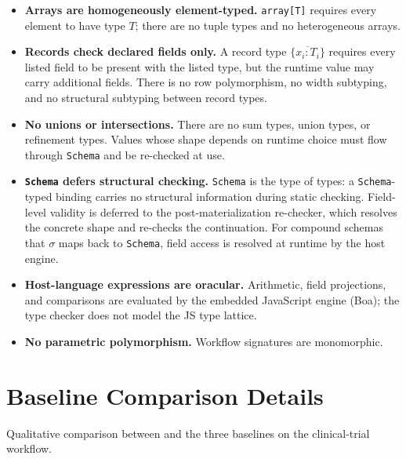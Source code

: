 \begin{itemize} \item \textbf{Arrays are homogeneously element-typed.}
\texttt{array[T]} requires every element to have type $T$; there are no tuple
types and no heterogeneous arrays.  \item \textbf{Records check declared fields
only.} A record type $\{\overline{x_i{:}T_i}\}$ requires every listed field to
be present with the listed type, but the runtime value may carry additional
fields. There is no row polymorphism, no width subtyping, and no structural
subtyping between record types.  \item \textbf{No unions or intersections.}
There are no sum types, union types, or refinement types. Values whose shape
depends on runtime choice must flow through \texttt{Schema} and be re-checked at
use.  \item \textbf{\texttt{Schema} defers structural checking.} \texttt{Schema}
is the type of types: a \texttt{Schema}-typed binding carries no structural
information during static checking. Field-level validity is deferred to the
post-materialization re-checker, which resolves the concrete shape and re-checks
the continuation. For compound schemas that $\sigma$ maps back to
\texttt{Schema}, field access is resolved at runtime by the host engine.  \item
\textbf{Host-language expressions are oracular.} Arithmetic, field projections,
and comparisons are evaluated by the embedded JavaScript engine (Boa); the \pact
type checker does not model the JS type lattice.  \item \textbf{No parametric
polymorphism.} Workflow signatures are monomorphic.  \end{itemize}

\section{Baseline Comparison Details}
\label{app:baselines}

Qualitative comparison between \pact and the three baselines on the clinical-trial workflow.

